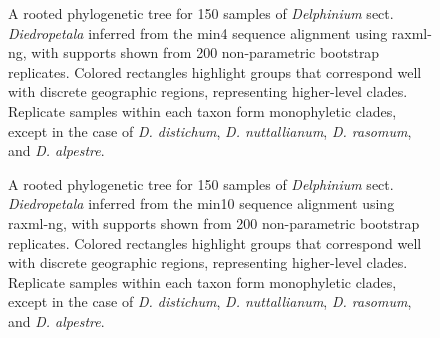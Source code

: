 \documentclass[11pt]{article}
\begin{document}
\begin{figure}[p]
	\centering
	\caption{
		A rooted phylogenetic tree for 150 samples of \emph{Delphinium} sect. \emph{Diedropetala}
		inferred from the min4 sequence alignment using raxml-ng, with supports shown from
		200 non-parametric bootstrap replicates. 
		Colored rectangles highlight
		groups that correspond well with discrete geographic regions, representing higher-level 
		clades. Replicate samples within each taxon form monophyletic clades, except in the case
		of \emph{D. distichum}, \emph{D. nuttallianum}, \emph{D. rasomum}, and \emph{D. alpestre}.
	}
	\label{fig:S2}
\end{figure}

\begin{figure}[p]
	\centering
	\caption{
		A rooted phylogenetic tree for 150 samples of \emph{Delphinium} sect. \emph{Diedropetala}
		inferred from the min10 sequence alignment using raxml-ng, with supports shown from
		200 non-parametric bootstrap replicates. 
		Colored rectangles highlight
		groups that correspond well with discrete geographic regions, representing higher-level 
		clades. Replicate samples within each taxon form monophyletic clades, except in the case
		of \emph{D. distichum}, \emph{D. nuttallianum}, \emph{D. rasomum}, and \emph{D. alpestre}.
	}
	\label{fig:S3}
\end{figure}
\end{document}
